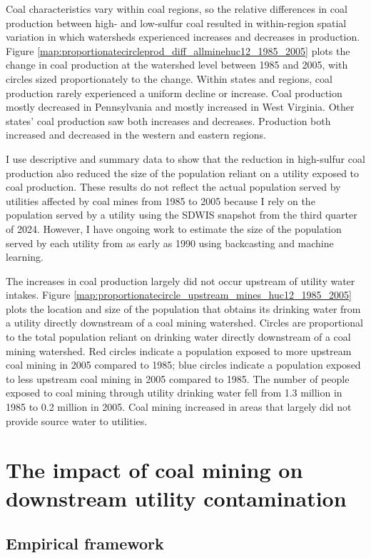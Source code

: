\documentclass[12pt]{article}
\begin{document}
Coal characteristics vary within coal regions, so the relative differences in coal production between high- and low-sulfur coal resulted in within-region spatial variation in which watersheds experienced increases and decreases in production. Figure \ref{map:proportionatecircleprod_diff_allminehuc12_1985_2005} plots the change in coal production at the watershed level between 1985 and 2005, with circles sized proportionately to the change. Within states and regions, coal production rarely experienced a uniform decline or increase. Coal production mostly decreased in Pennsylvania and mostly increased in West Virginia. Other states' coal production saw both increases and decreases. Production both increased and decreased in the western and eastern regions. 

I use descriptive and summary data to show that the reduction in high-sulfur coal production also reduced the size of the population reliant on a utility exposed to coal production. These results do not reflect the actual population served by utilities affected by coal mines from 1985 to 2005 because I rely on the population served by a utility using the SDWIS snapshot from the third quarter of 2024. However, I have ongoing work to estimate the size of the population served by each utility from as early as 1990 using backcasting and machine learning.

The increases in coal production largely did not occur upstream of utility water intakes. Figure \ref{map:proportionatecircle_upstream_mines_huc12_1985_2005} plots the location and size of the population that obtains its drinking water from a utility directly downstream of a coal mining watershed. Circles are proportional to the total population reliant on drinking water directly downstream of a coal mining watershed. Red circles indicate a population exposed to more upstream coal mining in 2005 compared to 1985; blue circles indicate a population exposed to less upstream coal mining in 2005 compared to 1985. The number of people exposed to coal mining through utility drinking water fell from 1.3 million in 1985 to 0.2 million in 2005. Coal mining increased in areas that largely did not provide source water to utilities.

\section{The impact of coal mining on downstream utility contamination}\label{sec:concentration}

\subsection{Empirical framework}
\end{document}
